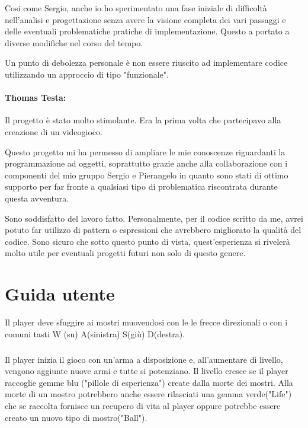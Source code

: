 \documentclass[a4paper,12pt]{report}
\begin{document}
Cosi come Sergio, anche io ho sperimentato una fase iniziale di difficoltà nell'analisi e progettazione senza avere la visione completa dei vari passaggi e delle eventuali problematiche pratiche di implementazione. Questo a portato a diverse modifiche nel corso del tempo.

Un punto di debolezza personale è non essere riuscito ad implementare codice utilizzando un approccio di tipo "funzionale".

\subsubsection*{Thomas Testa:}

Il progetto è stato molto stimolante. Era la prima volta che partecipavo alla creazione di un videogioco.

Questo progetto mi ha permesso di ampliare le mie conoscenze riguardanti la programmazione ad oggetti, soprattutto grazie anche alla collaborazione con i componenti del mio gruppo Sergio e Pierangelo in quanto sono stati di ottimo supporto per far fronte a qualsiasi tipo di problematica riscontrata durante questa avventura. 

Sono soddisfatto del lavoro fatto. Personalmente, per il codice scritto da me, avrei potuto far utilizzo di pattern o espressioni che avrebbero migliorato la qualità del codice. Sono sicuro che sotto questo punto di vista, quest'esperienza si rivelerà molto utile per eventuali progetti futuri non solo di questo genere.
\paragraph{}

\appendix
\chapter{Guida utente}

Il player deve sfuggire ai mostri muovendosi con le le frecce direzionali o con i comuni tasti W (su) A(sinistra) S(giù) D(destra).
\paragraph{}
Il player inizia il gioco con un'arma a disposizione e, all'aumentare di livello, vengono aggiunte nuove armi e tutte si potenziano.
%
Il livello cresce se il player raccoglie gemme blu ("pillole di esperienza") create dalla morte dei mostri.
Alla morte di un mostro potrebbero anche essere rilasciati una gemma verde("Life") che se raccolta fornisce un recupero di vita al player oppure potrebbe essere creato un nuovo tipo di mostro("Ball").
\end{document}
